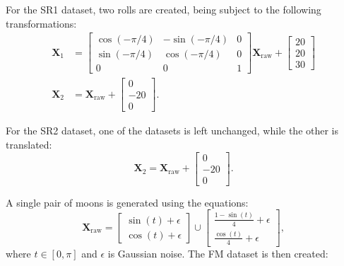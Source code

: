     For the \ac{SR1} dataset, two rolls are created, being subject to the following transformations:
    \begin{align}
        \boldsymbol{X}_1 & = \begin{bmatrix}
            \cos(-\pi/4) & -\sin(-\pi/4) & 0 \\
            \sin(-\pi/4) & \cos(-\pi/4) & 0 \\
            0 & 0 & 1
        \end{bmatrix} \boldsymbol{X}_\text{raw} + \begin{bmatrix}
            20 \\
            20 \\
            30
        \end{bmatrix} \\
        \boldsymbol{X}_2 & = \boldsymbol{X}_\text{raw} + \begin{bmatrix}
            0 \\
            -20 \\
            0
        \end{bmatrix}.
    \end{align}
    
    For the \ac{SR2} dataset, one of the datasets is left unchanged, while the other is translated:
    \begin{equation}
        \boldsymbol{X}_2 = \boldsymbol{X}_\text{raw} + \begin{bmatrix}
            0 \\
            -20 \\
            0
        \end{bmatrix}.
    \end{equation}

    A single pair of moons is generated using the equations:
    \begin{equation}
        \boldsymbol{X}_\text{raw}= \begin{bmatrix}
            \sin(t) + \epsilon\\
            \cos(t) + \epsilon
        \end{bmatrix}  \cup \begin{bmatrix}
            \frac{1 - \sin(t)}{4} + \epsilon\\
            \frac{\cos(t)}{4} + \epsilon
        \end{bmatrix},
    \end{equation}
    where $t \in [0, \pi]$ and $\epsilon$ is Gaussian noise. The \ac{FM} dataset is then created:

